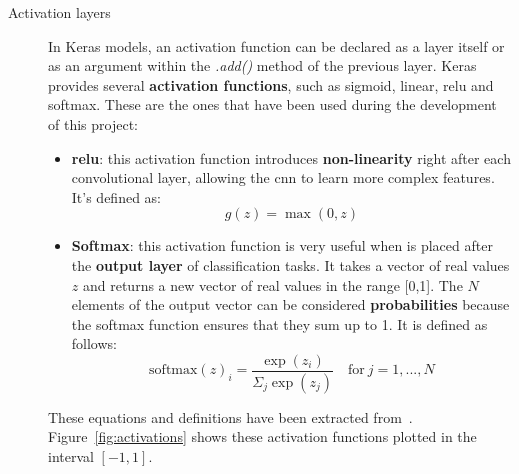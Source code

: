 \begin{description}
	\item[Activation layers] In Keras models, an activation function can be declared as a layer itself or as an argument within the \textit{.add()} method of the previous layer. Keras provides several \textbf{activation functions}, such as sigmoid, linear, \gls{relu} and softmax. These are the ones that have been used during the development of this project:
	\begin{itemize}
		\item \textbf{\gls{relu}}: this activation function introduces \textbf{non-linearity} right after each convolutional layer, allowing the \gls{cnn} to learn more complex features. It's defined as:
		\begin{equation}\label{eq:relu}
		g(z)=\max(0,z)
		\end{equation}
		
		\item \textbf{Softmax}: this activation function is very useful when is placed after the \textbf{output layer} of classification tasks. It takes a vector of real values $z$ and returns a new vector of real values in the range [0,1]. The $N$ elements of the output vector can be considered \textbf{probabilities} because the softmax function ensures that they sum up to 1. It is defined as follows:
		\begin{equation}\label{eq:SoftMax}
		\mathrm{softmax}(z)_i=\frac{\exp(z_i)}{\Sigma_{j}{\exp(z_j)}} \quad \mathrm{for} \ j=1, ...,N
		\end{equation}
	\end{itemize}
	These equations and definitions have been extracted from~\cite{Goodfellow-et-al-2016}. Figure~\ref{fig:activations} shows these activation functions plotted in the interval $[-1,1]$.


\end{description}
